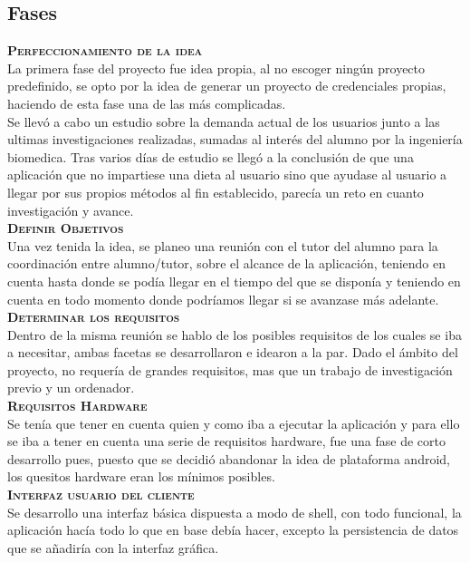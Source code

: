\subsection{Fases}
\textbf{\textsc{Perfeccionamiento de la idea}}\\
La primera fase del proyecto fue idea propia, al no escoger ningún proyecto predefinido, se opto por la idea de generar un proyecto de credenciales propias, haciendo de esta fase una de las más complicadas.\\
Se llevó a cabo un estudio sobre la demanda actual de los usuarios junto a las ultimas investigaciones realizadas, sumadas al interés del alumno por la ingeniería biomedica. Tras varios días de estudio se llegó a la conclusión de que una aplicación que no impartiese una dieta al usuario sino que ayudase al usuario a llegar por sus propios métodos al fin establecido, parecía un reto en cuanto investigación y avance.\\

\textbf{\textsc{Definir Objetivos}}\\
Una vez tenida la idea, se planeo una reunión con el tutor del alumno para la coordinación entre alumno/tutor, sobre el alcance de la aplicación, teniendo en cuenta hasta donde se podía llegar en el tiempo del que se disponía y teniendo en cuenta en todo momento donde podríamos llegar si se avanzase más adelante.\\

\textbf{\textsc{Determinar los requisitos}}\\
Dentro de la misma reunión se hablo de los posibles requisitos de los cuales se iba a necesitar, ambas facetas se desarrollaron e idearon a la par. Dado el ámbito del proyecto, no requería de grandes requisitos, mas que un trabajo de investigación previo y un ordenador.\\

\textbf{\textsc{Requisitos Hardware}}\\
Se tenía que tener en cuenta quien y como iba a ejecutar la aplicación y para ello se iba a tener en cuenta una serie de requisitos hardware, fue una fase de corto desarrollo pues, puesto que se decidió abandonar la idea de plataforma android, los quesitos hardware eran los mínimos posibles.\\

\textbf{\textsc{Interfaz usuario del cliente}}\\
Se desarrollo una interfaz básica dispuesta a modo de shell, con todo funcional, la aplicación hacía todo lo que en base debía hacer, excepto la persistencia de datos que se añadiría con la interfaz gráfica.\\

